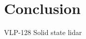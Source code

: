 \let\textcircled=\pgftextcircled


\chapter{Conclusion}
\label{chap:conclusion}


VLP-128 
Solid state lidar 


%
%
